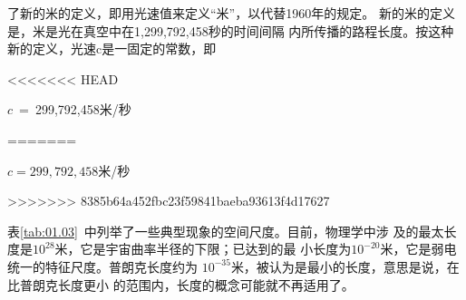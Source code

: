 \noindent 了新的米的定义，即用光速值来定义“米”，以代替1960年的规定。
新的米的定义是，米是光在真空中在1,299,792,458秒的时间间隔
内所传播的路程长度。按这种新的定义，光速c是一固定的常数，即

<<<<<<< HEAD
\centerline{$c$~=~299,792,458米/秒}
=======
\centerline{$c=299,792,458$米/秒}
>>>>>>> 8385b64a452fbc23f59841baeba93613f4d17627

表\ref{tab:01.03}~中列举了一些典型现象的空间尺度。目前，物理学中涉
及的最太长度是$10^{28}$米，它是宇宙曲率半径的下限；已达到的最
小长度为$10^{-20}$米，它是弱电统一的特征尺度。普朗克长度约为
$10^{-35}$米，被认为是最小的长度，意思是说，在比普朗克长度更小
的范围内，长度的概念可能就不再适用了。
